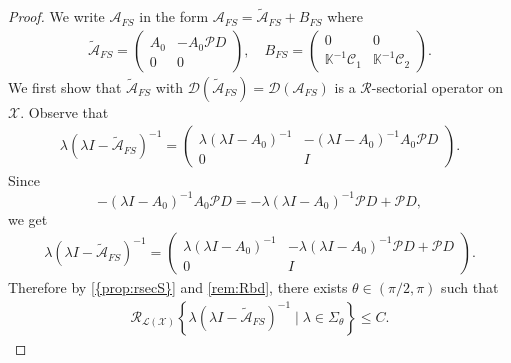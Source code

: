 \documentclass[12pt,a4paper,reqno]{amsart}
\theoremstyle{definition}
\theoremstyle{remark}
\numberwithin{equation}{section}
\newcommand{\mx}{\mathcal{X}}
\newcommand{\mr}{\mathcal{R}}
\newcommand{\mpp}{\mathcal{P}}
\begin{document}
\begin{proof}
We write $\mathcal{A}_{FS} $   in the form $\mathcal{A}_{FS} = \widetilde {\mathcal{A}}_{FS} + B_{FS}$ where
\begin{align*}
\widetilde{\mathcal{A}}_{FS}  = \begin{pmatrix}  A_{0}  &    -  A_{0}\mpp D \\  0 & 0  \end{pmatrix}, \quad
B_{FS} = \begin{pmatrix}  0  &    0 \\  \mathbb{K}^{-1} \mathcal{C}_{1} & \mathbb{K}^{-1} \mathcal{C}_{2}  \end{pmatrix}.
\end{align*}
We first show that $\widetilde{\mathcal{A}}_{FS}$ with $\mathcal{D}(\widetilde{\mathcal{A}}_{FS}) = \mathcal{D}(\mathcal{A}_{FS})$ is a $\mr$-sectorial operator on $\mx$. Observe that
\begin{align*}
\lambda (\lambda I  - \widetilde{\mathcal{A}}_{FS})^{-1} =  \begin{pmatrix}
\lambda (\lambda I -  A_{0})^{-1} & -(\lambda I -  A_{0})^{-1} A_{0} \mpp D \\ 0 & I
\end{pmatrix}.
\end{align*}
Since
$$
-(\lambda I -  A_{0})^{-1} A_{0} \mpp D = -\lambda(\lambda I - A_{0})^{-1} \mpp D + \mpp D,
$$
we get
\begin{align*}
\lambda (\lambda I  - \widetilde{\mathcal{A}}_{FS})^{-1} =  \begin{pmatrix}
\lambda (\lambda I -  A_{0})^{-1} &-\lambda(\lambda I - A_{0})^{-1}\mpp  D + \mpp D \\ 0 & I
\end{pmatrix}.
\end{align*}
Therefore by \cref{{prop:rsecS}} and \cref{rem:Rbd}, there exists $\theta \in (\pi/2,\pi)$ such that
\begin{align} \label{eq:rb1}
\mathcal{R}_{\mathcal{L}(\mx)} \left\{ \lambda(\lambda I  - \widetilde{{\mathcal A}}_{FS})^{-1} \mid \lambda \in \Sigma_{\theta} \right\} \leqslant C.
\end{align}


\end{proof}
\end{document}
